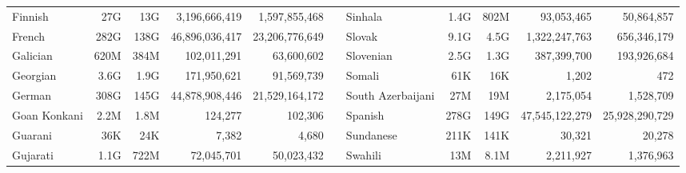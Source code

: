 \begin{table*}[t!]
\begin{tabular}{lrrrrclrrrr}
        Finnish                   & 27G                      & 13G                       & 3,196,666,419            & 1,597,855,468             &                          & Sinhala                   & 1.4G                     & 802M                      & 93,053,465               & 50,864,857                \\
        French                    & 282G                     & 138G                      & 46,896,036,417           & 23,206,776,649            &                          & Slovak                    & 9.1G                     & 4.5G                      & 1,322,247,763            & 656,346,179               \\
        Galician                  & 620M                     & 384M                      & 102,011,291              & 63,600,602                &                          & Slovenian                 & 2.5G                     & 1.3G                      & 387,399,700              & 193,926,684               \\
        Georgian                  & 3.6G                     & 1.9G                      & 171,950,621              & 91,569,739                &                          & Somali                    & 61K                      & 16K                       & 1,202                    & 472                       \\
        German                    & 308G                     & 145G                      & 44,878,908,446           & 21,529,164,172            &                          & South Azerbaijani         & 27M                      & 19M                       & 2,175,054                & 1,528,709                 \\
        Goan Konkani              & 2.2M                     & 1.8M                      & 124,277                  & 102,306                   &                          & Spanish                   & 278G                     & 149G                      & 47,545,122,279           & 25,928,290,729            \\
        Guarani                   & 36K                      & 24K                       & 7,382                    & 4,680                     &                          & Sundanese                 & 211K                     & 141K                      & 30,321                   & 20,278                    \\
        Gujarati                  & 1.1G                     & 722M                      & 72,045,701               & 50,023,432                &                          & Swahili                   & 13M                      & 8.1M                      & 2,211,927                & 1,376,963                 \\

\end{tabular}
\end{table*}
